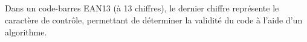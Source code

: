 \documentclass{article}
\title{\Document\ \Titre \Type}
\author{}
\date{}
\begin{document}
\pagestyle{fancy}
\fancyhead{} %
\fancyhead[R]{\Structure}
\fancyhead[L]{\Niveau}
\fancyfoot{} %
\fancyfoot[C]{\thepage}


\maketitle
\vspace{-4em}

Dans un code-barres EAN13 (à 13 chiffres), le dernier chiffre représente le caractère de contrôle, permettant de déterminer la validité du code à l’aide d’un algorithme.
\end{document}
